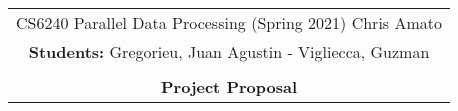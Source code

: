 \documentclass{article}
\begin{document}
\begin{center}
    \begin{tabular}{|c|}
        \hline
        CS6240 Parallel Data Processing (Spring 2021) \hspace{2cm} Chris Amato
         \\
        \textbf{Students:} Gregorieu, Juan Agustin - Vigliecca, Guzman \hfill \\\\
        {\bfseries \large  Project Proposal}\\ \hline 
    \end{tabular} 
\end{center}

\newcommand{\ignore}[2]{\hspace{0in}#2}


\begin{enumerate}
	

\end{enumerate}
\end{document}
